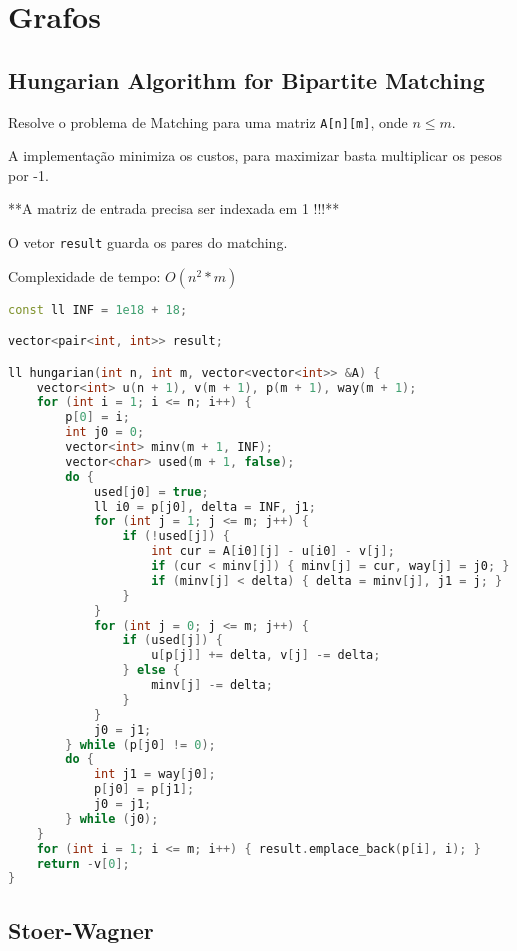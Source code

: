 \documentclass[11pt, a4paper, twoside]{article}
\begin{document}
\newpage
%
%
%
%

\section{Grafos}

\subsection{Hungarian Algorithm for Bipartite Matching}


Resolve o problema de Matching para uma matriz \lstinline{A[n][m]}, onde $n \leq m$.

A implementação minimiza os custos, para maximizar basta multiplicar os pesos por -1.

**A matriz de entrada precisa ser indexada em 1 !!!**

O vetor \lstinline{result} guarda os pares do matching.

Complexidade de tempo: $O(n^2 * m)$

\begin{lstlisting}[language=C++]
const ll INF = 1e18 + 18;

vector<pair<int, int>> result;

ll hungarian(int n, int m, vector<vector<int>> &A) {
    vector<int> u(n + 1), v(m + 1), p(m + 1), way(m + 1);
    for (int i = 1; i <= n; i++) {
        p[0] = i;
        int j0 = 0;
        vector<int> minv(m + 1, INF);
        vector<char> used(m + 1, false);
        do {
            used[j0] = true;
            ll i0 = p[j0], delta = INF, j1;
            for (int j = 1; j <= m; j++) {
                if (!used[j]) {
                    int cur = A[i0][j] - u[i0] - v[j];
                    if (cur < minv[j]) { minv[j] = cur, way[j] = j0; }
                    if (minv[j] < delta) { delta = minv[j], j1 = j; }
                }
            }
            for (int j = 0; j <= m; j++) {
                if (used[j]) {
                    u[p[j]] += delta, v[j] -= delta;
                } else {
                    minv[j] -= delta;
                }
            }
            j0 = j1;
        } while (p[j0] != 0);
        do {
            int j1 = way[j0];
            p[j0] = p[j1];
            j0 = j1;
        } while (j0);
    }
    for (int i = 1; i <= m; i++) { result.emplace_back(p[i], i); }
    return -v[0];
}
\end{lstlisting}

\subsection{Stoer-Wagner}
\end{document}
